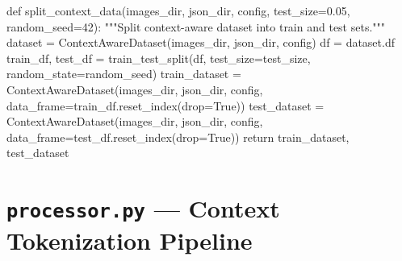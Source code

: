 \documentclass[11pt, a4paper]{report}
\begin{document}
\begin{newcode}
def split_context_data(images_dir, json_dir, config,
                       test_size=0.05, random_seed=42):
    """Split context-aware dataset into train and test sets."""
    dataset = ContextAwareDataset(images_dir, json_dir, config)
    df = dataset.df
    train_df, test_df = train_test_split(df, test_size=test_size,
                                         random_state=random_seed)
    train_dataset = ContextAwareDataset(images_dir, json_dir, config,
                       data_frame=train_df.reset_index(drop=True))
    test_dataset = ContextAwareDataset(images_dir, json_dir, config,
                       data_frame=test_df.reset_index(drop=True))
    return train_dataset, test_dataset
\end{newcode}


\section{\texttt{processor.py} --- Context Tokenization Pipeline}
\label{sec:code-processor}
\end{document}
